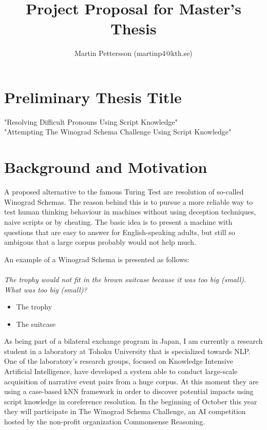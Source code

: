 \documentclass{article}
\begin{document}
\title{Project Proposal for Master's Thesis}
\author{Martin Pettersson (martinp4@kth.se)}
\maketitle

\section{Preliminary Thesis Title}
"Resolving Difficult Pronouns Using Script Knowledge"\\
"Attempting The Winograd Schema Challenge Using Script Knowledge"

\section{Background and Motivation}
A proposed alternative to the famous Turing Test are resolution of so-called Winograd Schemas. The reason behind this is to pursue a more reliable way to test human thinking behaviour in machines without using deception techniques, naive scripts or by cheating. The basic idea is to present a machine with questions that are easy to answer for English-speaking adults, but still so ambigous that a large corpus probably would not help much. 

An example of a Winograd Schema is presented as follows:
\\ \\
{\it The trophy would not fit in the brown suitcase because it was too big (small). What was too big (small)?}
\begin{itemize}
  \item The trophy
  \item The suitcase
\end{itemize}

As being part of a bilateral exchange program in Japan, I am currently a research student in a laboratory at Tohoku University that is specialized towards NLP. One of the laboratory's research groups, focused on Knowledge Intensive Artificial Intelligence, have developed a system able to conduct large-scale acquisition of narrative event pairs from a huge corpus. At this moment they are using a case-based kNN framework in order to discover potential impacts using script knowledge in coreference resolution. In the beginning of October this year they will participate in The Winograd Schema Challenge, an AI competition hosted by the non-profit organization Commonsense Reasoning.
\end{document}
